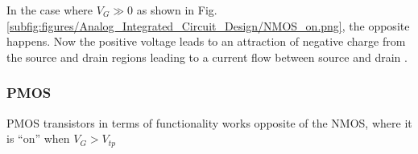 In the case where $V_G\gg0$ as shown in Fig. \ref{subfig:figures/Analog_Integrated_Circuit_Design/NMOS_on.png}, the opposite happens. Now the positive voltage leads to an attraction of negative charge from the source and drain regions leading to a current flow between source and drain \cite[p. 16]{carusone_2012_analog}.




\subsubsection{PMOS}
PMOS transistors in terms of functionality works opposite of the NMOS, where it is ``on'' when $V_G > V_{tp}$